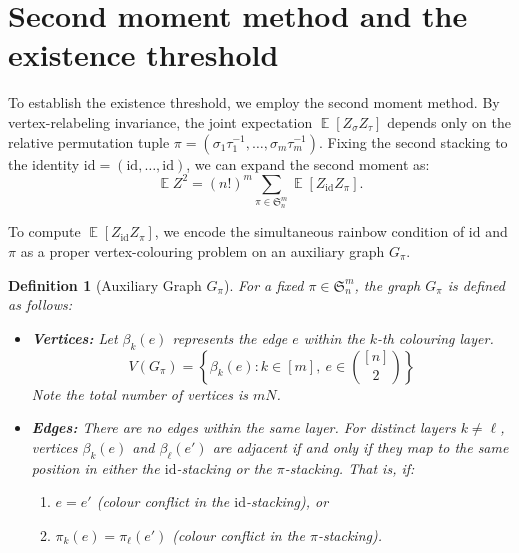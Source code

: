 \documentclass[10pt,a4paper]{amsart}
\newtheorem{definition}[theorem]{Definition}
\newcommand\E{\operatorname{\mathbb{E}}}
\begin{document}
\medskip


\section{Second moment method and the existence threshold}\label{sec:second_moment}

To establish the existence threshold, we employ the second moment method. By vertex-relabeling invariance, the joint expectation $\E[Z_\sigma Z_\tau]$ depends only on the relative permutation tuple $\pi = (\sigma_1\tau_1^{-1},\ldots,\sigma_m\tau_m^{-1})$. Fixing the second stacking to the identity $\mathrm{id} = (\mathrm{id},\ldots,\mathrm{id})$, we can expand the second moment as:
\begin{equation}\label{eq:second_moment_reduction}
        \E Z^2=(n!)^m\sum_{\pi\in\mathfrak S_n^m} \E[Z_{\mathrm{id}}Z_\pi].
\end{equation}

To compute $\E[Z_{\mathrm{id}}Z_\pi]$, we encode the simultaneous rainbow condition of $\mathrm{id}$ and $\pi$ as a proper vertex-colouring problem on an auxiliary graph $G_\pi$.

\begin{definition}[Auxiliary Graph $G_\pi$]\label{def:aux_graph}
For a fixed $\pi\in\mathfrak S_n^m$, the graph $G_\pi$ is defined as follows:
\begin{itemize}
    \item \textbf{Vertices:} Let $\beta_k(e)$ represents the edge $e$ within the $k$-th colouring layer.
    $$V(G_\pi)=\left\{\beta_k(e): k\in[m],\ e\in\binom{[n]}2\right\}$$ 
    Note the total number of vertices is $mN$.
    
    \item \textbf{Edges:} There are no edges within the same layer. For distinct layers $k\neq \ell$, vertices $\beta_k(e)$ and $\beta_\ell(e')$ are adjacent if and only if they map to the same position in either the $\mathrm{id}$-stacking or the $\pi$-stacking. That is, if:
    \begin{enumerate}[label=\textup{(\roman*)}]
        \item $e=e'$ \quad (colour conflict in the $\mathrm{id}$-stacking), or
        \item $\pi_k(e)=\pi_\ell(e')$ \quad (colour conflict in the $\pi$-stacking).
    \end{enumerate}
\end{itemize}
\end{definition}
\end{document}

